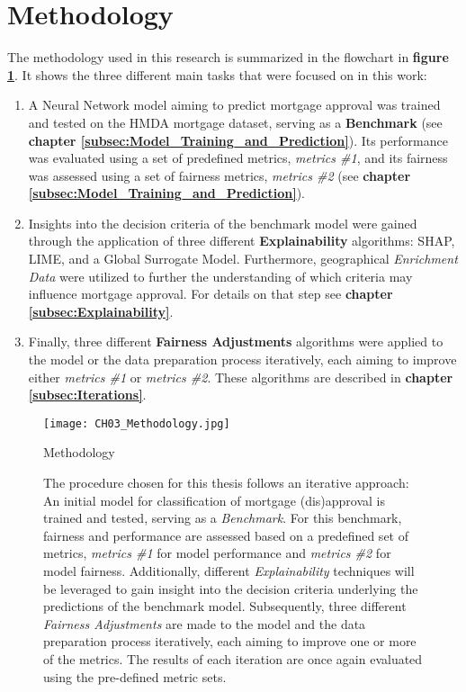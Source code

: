 \section{Methodology}\label{sec:Methodology}

The methodology used in this research is summarized in the flowchart in \textbf{figure \ref{fig:CH03_Methodology}}. It shows the three different main tasks that were focused on in this work:

\begin{enumerate}
    \item A Neural Network model aiming to predict mortgage approval was trained and tested on the HMDA mortgage dataset, serving as a \textbf{Benchmark} (see \textbf{chapter \ref{subsec:Model_Training_and_Prediction}}). Its performance was evaluated using a set of predefined metrics, \textit{metrics \#1}, and its fairness was assessed using a set of fairness metrics, \textit{metrics \#2} (see \textbf{chapter \ref{subsec:Model_Training_and_Prediction}}). 
    \item Insights into the decision criteria of the benchmark model were gained through the application of three different \textbf{Explainability} algorithms: SHAP, LIME, and a Global Surrogate Model. Furthermore, geographical \textit{Enrichment Data} were utilized to further the understanding of which criteria may influence mortgage approval. For details on that step see \textbf{chapter \ref{subsec:Explainability}}.
    \item Finally, three different \textbf{Fairness Adjustments} algorithms were applied to the model or the data preparation process iteratively, each aiming to improve either \textit{metrics \#1} or \textit{metrics \#2}. These algorithms are described in \textbf{chapter \ref{subsec:Iterations}}.
\end{enumerate}

\begin{figure}[h]
    \centering
    \texttt{[image: CH03\_Methodology.jpg]}
    \caption{Methodology}
    \caption*{The procedure chosen for this thesis follows an iterative approach: An initial model for classification of mortgage (dis)approval is trained and tested, serving as a \textit{Benchmark}. 
    For this benchmark, fairness and performance are assessed based on a predefined set of metrics, \textit{metrics \#1} for model performance and \textit{metrics \#2} for model fairness. 
    Additionally, different \textit{Explainability} techniques will be leveraged to gain insight into the decision criteria underlying the predictions of the benchmark model. 
    Subsequently, three different \textit{Fairness Adjustments} are made to the model and the data preparation process iteratively, each aiming to improve one or more of the metrics. 
    The results of each iteration are once again evaluated using the pre-defined metric sets.}
    \label{fig:CH03_Methodology}
\end{figure}

